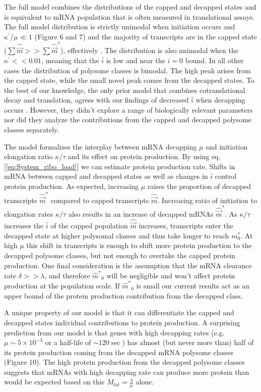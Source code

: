 \documentclass[a4,center,fleqn,nocrop]{NAR}
\newcommand{\kappaprime}{\ensuremath{\kappa^{\prime}}\xspace}
\newcommand{\mhat}{\ensuremath{\hat{m}}\xspace}
\newcommand{\mhatstar}{\ensuremath{\mhat^{*}}\xspace}
\newcommand{\mvec}{\ensuremath{\vec{m}}\xspace}
\newcommand{\mvechat}{\ensuremath{\hat{\mvec}}\xspace}
\newcommand{\mvechatstar}{\ensuremath{\mvechat^*}\xspace}
\newcommand{\MRL}{\ensuremath{\bar{i}}\xspace}
\begin{document}
The full model combines the distributions of the capped and decapped states and is equivalent to mRNA population that is often measured in translational assays.
The full model distribution is strictly unimodal when initiation occurs and $\kappaprime/\mu \ll 1$ (Figure 6 and 7) and the majority of transcripts are in the capped state ($\sum \mvechat >> \sum \mvechatstar$), effectively .
The distribution is also unimodal when the $\kappaprime << 0.01$, meaning that the \MRL is low and near the $i=0$ bound. 
In all other cases the distribution of polysome classes is bimodal. The high peak arises from the capped state, while the small novel  peak comes from the decapped states. 
To the best of our knowledge, the only prior model that combines cotranslational decay and translation, agrees with our findings of decreased \MRL when decapping occurs \citep{RN22}. However, they didn't explore a range of biologically relevant parameters nor did they analyze the contributions from the capped and decapped polysome classes separately.

The model formalizes the interplay between mRNA decapping $\mu$ and initiation elongation ratio $\kappa/\tau$ and its effect on protein production.
By using eq.  [\ref{eq:System_ribo_load}] we can estimate protein production rate.
Shifts in mRNA between capped and decapped states as well as changes in \MRL control protein production.
As expected, increasing $\mu$ raises the proportion of decapped transcripts \mvechatstar compared to capped transcripts \mvechat.
Increasing ratio of initiation to elongation rates $\kappa/\tau$ also results in an increase of decapped mRNAs \mvechatstar.
As $\kappa/\tau$ increases the \MRL of the capped population \mvechat increases, transcripts enter the decapped state at higher polysomal classes and thus take longer to reach $m_0^*$.
At high $\mu$ this shift in transcripts is enough to shift more protein production to the decapped polysome classes, but not enough to overtake the capped protein production.
One final consideration is the assumption that the mRNA clearance rate $\delta >> \lambda$, and therefore $\mhatstar_0$ will be negligible and won't affect protein production at the population scale. If $\mhatstar_0$ is small our current results act as an upper bound of the protein production contribution from the decapped class. 


A unique property of our model is that it can differentiate the capped and decapped states individual contributions to protein production. 
A surprising prediction from our model is that genes with  high decapping rates (e.g. $\mu  \sim 5 \times 10^{-3}$ or a half-life of $\sim 120 \sec$) has almost (but never more than) half of its protein production coming from the decapped mRNA polysome classes (Figure 10).
The high protein production from the decapped polysome classes suggests that mRNAs with high decapping rate can produce more protein than would be expected based on this $M_{tot} = \frac{\lambda}{\mu}$ alone. 
\end{document}
